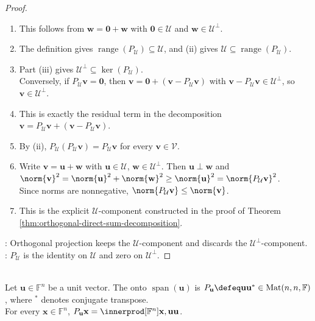 \begin{proposition}
\begin{proof}
\begin{enumerate}[label=(\roman*)]
\item This follows from $\mathbf{w}=\mathbf{0}+\mathbf{w}$ with $\mathbf{0}\in\mathcal{U}$ and $\mathbf{w}\in\mathcal{U}^{\perp}$.
\item The definition gives $\operatorname{range}(P_{\mathcal{U}})\subseteq\mathcal{U}$, and (ii) gives $\mathcal{U}\subseteq\operatorname{range}(P_{\mathcal{U}})$.
\item Part (iii) gives $\mathcal{U}^{\perp}\subseteq\ker(P_{\mathcal{U}})$.\\
Conversely, if $P_{\mathcal{U}}\mathbf{v}=\mathbf{0}$, then $\mathbf{v}=\mathbf{0}+(\mathbf{v}-P_{\mathcal{U}}\mathbf{v})$ with $\mathbf{v}-P_{\mathcal{U}}\mathbf{v}\in\mathcal{U}^{\perp}$, so $\mathbf{v}\in\mathcal{U}^{\perp}$.
\item This is exactly the residual term in the decomposition $\mathbf{v}=P_{\mathcal{U}}\mathbf{v}+(\mathbf{v}-P_{\mathcal{U}}\mathbf{v})$.
\item By (ii), $P_{\mathcal{U}}(P_{\mathcal{U}}\mathbf{v})=P_{\mathcal{U}}\mathbf{v}$ for every $\mathbf{v}\in\mathcal{V}$.
\item Write $\mathbf{v}=\mathbf{u}+\mathbf{w}$ with $\mathbf{u}\in\mathcal{U}$, $\mathbf{w}\in\mathcal{U}^{\perp}$. Then $\mathbf{u}\perp\mathbf{w}$ and $\norm{\mathbf{v}}^2=\norm{\mathbf{u}}^2+\norm{\mathbf{w}}^2\geq\norm{\mathbf{u}}^2=\norm{P_{\mathcal{U}}\mathbf{v}}^2$.\\
Since norms are nonnegative, $\norm{P_{\mathcal{U}}\mathbf{v}}\leq\norm{\mathbf{v}}$.
\item This is the explicit $\mathcal{U}$-component constructed in the proof of Theorem \ref{thm:orthogonal-direct-sum-decomposition}.
\end{enumerate}
: Orthogonal projection keeps the $\mathcal{U}$-component and discards the $\mathcal{U}^{\perp}$-component.\\
: $P_{\mathcal{U}}$ is the identity on $\mathcal{U}$ and zero on $\mathcal{U}^{\perp}$.
\end{proof}
\end{proposition}

\begin{definition} \label{def:rank-one-projection-matrix} \\
Let $\mathbf{u}\in\mathbb{F}^n$ be a unit vector. The  onto $\operatorname{span}(\mathbf{u})$ is $P_{\mathbf{u}}\defeq \mathbf{u}\mathbf{u}^*\in\operatorname{Mat}(n,n,\mathbb{F})$, where $^*$ denotes conjugate transpose.\\
For every $\mathbf{x}\in\mathbb{F}^n$, $P_{\mathbf{u}}\mathbf{x}=\innerprod[\mathbb{F}^n]{\mathbf{x},\mathbf{u}}\mathbf{u}$.
\end{definition}

